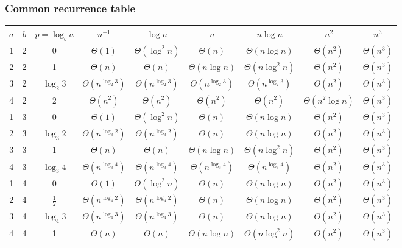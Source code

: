 \documentclass[9pt]{extarticle}
\begin{document}
\subsubsection{Common recurrence table}
\begin{center}
    \scriptsize
    \setlength{\tabcolsep}{4pt}
    \renewcommand{\arraystretch}{1.15}
    \begin{tabular}{ccccccccc}
    \hline
    $a$ & $b$ & $p=\log_b a$ & $n^{-1}$ & $\log n$ & $n$ & $n\log n$ & $n^{2}$ & $n^{3}$ \\
    \hline
    1 & 2 & 0 & $\Theta(1)$ & $\Theta(\log^{2} n)$ & $\Theta(n)$ & $\Theta(n\log n)$ & $\Theta(n^{2})$ & $\Theta(n^{3})$ \\
    2 & 2 & 1 & $\Theta(n)$ & $\Theta(n)$ & $\Theta(n\log n)$ & $\Theta(n\log^{2} n)$ & $\Theta(n^{2})$ & $\Theta(n^{3})$ \\
    3 & 2 & $\log_{2}3$ & $\Theta(n^{\log_{2}3})$ & $\Theta(n^{\log_{2}3})$ & $\Theta(n^{\log_{2}3})$ & $\Theta(n^{\log_{2}3})$ & $\Theta(n^{2})$ & $\Theta(n^{3})$ \\
    4 & 2 & 2 & $\Theta(n^{2})$ & $\Theta(n^{2})$ & $\Theta(n^{2})$ & $\Theta(n^{2})$ & $\Theta(n^{2}\log n)$ & $\Theta(n^{3})$ \\
    \hline
    1 & 3 & 0 & $\Theta(1)$ & $\Theta(\log^{2} n)$ & $\Theta(n)$ & $\Theta(n\log n)$ & $\Theta(n^{2})$ & $\Theta(n^{3})$ \\
    2 & 3 & $\log_{3}2$ & $\Theta(n^{\log_{3}2})$ & $\Theta(n^{\log_{3}2})$ & $\Theta(n)$ & $\Theta(n\log n)$ & $\Theta(n^{2})$ & $\Theta(n^{3})$ \\
    3 & 3 & 1 & $\Theta(n)$ & $\Theta(n)$ & $\Theta(n\log n)$ & $\Theta(n\log^{2} n)$ & $\Theta(n^{2})$ & $\Theta(n^{3})$ \\
    4 & 3 & $\log_{3}4$ & $\Theta(n^{\log_{3}4})$ & $\Theta(n^{\log_{3}4})$ & $\Theta(n^{\log_{3}4})$ & $\Theta(n^{\log_{3}4})$ & $\Theta(n^{2})$ & $\Theta(n^{3})$ \\
    \hline
    1 & 4 & 0 & $\Theta(1)$ & $\Theta(\log^{2} n)$ & $\Theta(n)$ & $\Theta(n\log n)$ & $\Theta(n^{2})$ & $\Theta(n^{3})$\\
    2 & 4 & $\tfrac12$ & $\Theta(n^{\log_{4}2})$ & $\Theta(n^{\log_{4}2})$ & $\Theta(n)$ & $\Theta(n\log n)$ & $\Theta(n^{2})$ & $\Theta(n^{3})$ \\
    3 & 4 & $\log_{4}3$ & $\Theta(n^{\log_{4}3})$ & $\Theta(n^{\log_{4}3})$ & $\Theta(n)$ & $\Theta(n\log n)$ & $\Theta(n^{2})$ & $\Theta(n^{3})$ \\
    4 & 4 & 1 & $\Theta(n)$ & $\Theta(n)$ & $\Theta(n\log n)$ & $\Theta(n\log^{2} n)$ & $\Theta(n^{2})$ & $\Theta(n^{3})$ \\
    \hline
    \end{tabular}
    \end{center}
    
\end{document}
